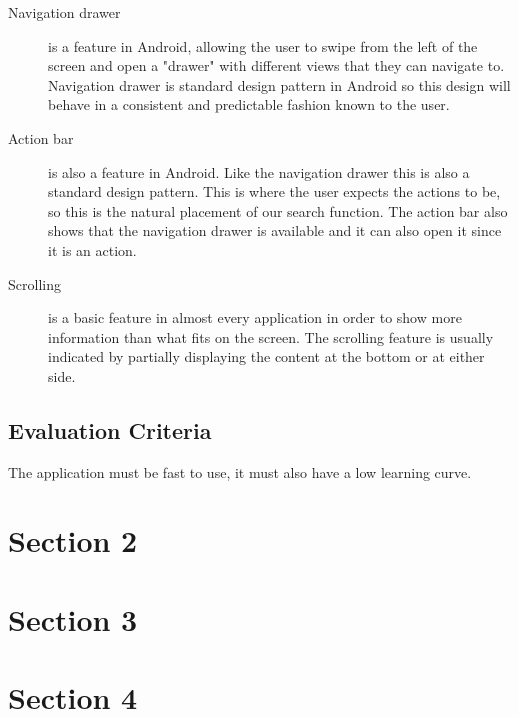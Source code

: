 \documentclass[a4paper,12pt]{memoir}
\begin{document}
\begin{description}

\item [Navigation drawer] is a feature in Android, allowing the user to swipe from the left of the screen and open a "drawer" with different views that they can navigate to. Navigation drawer is standard design pattern in Android so this design will behave in a consistent and predictable fashion known to the user.
\item [Action bar] is also a feature in Android. Like the navigation drawer this is also a standard design pattern. This is where the user expects the actions to be, so this is the natural placement of our search function. The action bar also shows that the navigation drawer is available and it can also open it since it is an action. 
\item[Scrolling] is a basic feature in almost every application in order to show more information than what fits on the screen. The scrolling feature is usually indicated by partially displaying the content at the bottom or at either side.

\end{description}

\section*{Evaluation Criteria}

The application must be fast to use, it must also have a low learning curve.

\chapter*{Section 2}



\chapter*{Section 3}


\chapter*{Section 4}
\end{document}

